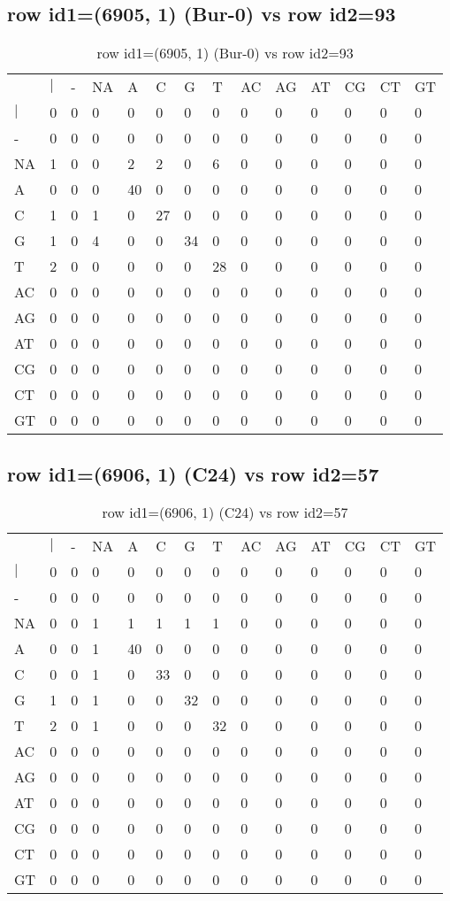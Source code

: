 \subsection{row id1=(6905, 1) (Bur-0) vs row id2=93}
\begin{center}
\begin{longtable}{|l|l|l|l|l|l|l|l|l|l|l|l|l|l|}
\caption{row id1=(6905, 1) (Bur-0) vs row id2=93} \label{table_dm76}\\
\hline
\\
\hline
&$|$&-&NA&A&C&G&T&AC&AG&AT&CG&CT&GT\\
$|$&0&0&0&0&0&0&0&0&0&0&0&0&0\\
-&0&0&0&0&0&0&0&0&0&0&0&0&0\\
NA&1&0&0&2&2&0&6&0&0&0&0&0&0\\
A&0&0&0&40&0&0&0&0&0&0&0&0&0\\
C&1&0&1&0&27&0&0&0&0&0&0&0&0\\
G&1&0&4&0&0&34&0&0&0&0&0&0&0\\
T&2&0&0&0&0&0&28&0&0&0&0&0&0\\
AC&0&0&0&0&0&0&0&0&0&0&0&0&0\\
AG&0&0&0&0&0&0&0&0&0&0&0&0&0\\
AT&0&0&0&0&0&0&0&0&0&0&0&0&0\\
CG&0&0&0&0&0&0&0&0&0&0&0&0&0\\
CT&0&0&0&0&0&0&0&0&0&0&0&0&0\\
GT&0&0&0&0&0&0&0&0&0&0&0&0&0\\
\hline
\end{longtable}
\end{center}

\subsection{row id1=(6906, 1) (C24) vs row id2=57}
\begin{center}
\begin{longtable}{|l|l|l|l|l|l|l|l|l|l|l|l|l|l|}
\caption{row id1=(6906, 1) (C24) vs row id2=57} \label{table_dm78}\\
\hline
\\
\hline
&$|$&-&NA&A&C&G&T&AC&AG&AT&CG&CT&GT\\
$|$&0&0&0&0&0&0&0&0&0&0&0&0&0\\
-&0&0&0&0&0&0&0&0&0&0&0&0&0\\
NA&0&0&1&1&1&1&1&0&0&0&0&0&0\\
A&0&0&1&40&0&0&0&0&0&0&0&0&0\\
C&0&0&1&0&33&0&0&0&0&0&0&0&0\\
G&1&0&1&0&0&32&0&0&0&0&0&0&0\\
T&2&0&1&0&0&0&32&0&0&0&0&0&0\\
AC&0&0&0&0&0&0&0&0&0&0&0&0&0\\
AG&0&0&0&0&0&0&0&0&0&0&0&0&0\\
AT&0&0&0&0&0&0&0&0&0&0&0&0&0\\
CG&0&0&0&0&0&0&0&0&0&0&0&0&0\\
CT&0&0&0&0&0&0&0&0&0&0&0&0&0\\
GT&0&0&0&0&0&0&0&0&0&0&0&0&0\\
\hline
\end{longtable}
\end{center}

